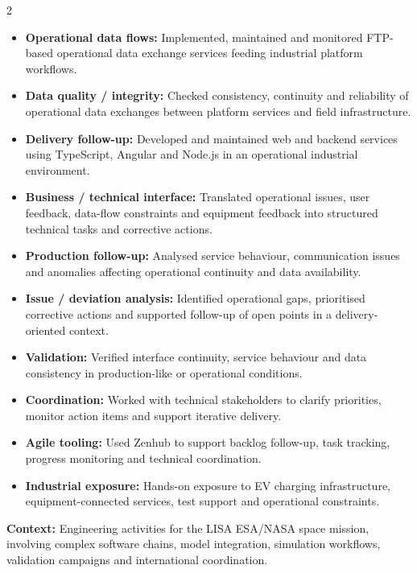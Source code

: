 \documentclass[8pt,a4paper,ragged2e,withhyper]{altacv}
\begin{document}
\begin{paracol}{2}
\begin{itemize}
  \item \textbf{Operational data flows:} Implemented, maintained and monitored FTP-based operational data exchange services feeding industrial platform workflows.
  \item \textbf{Data quality / integrity:} Checked consistency, continuity and reliability of operational data exchanges between platform services and field infrastructure.
  \item \textbf{Delivery follow-up:} Developed and maintained web and backend services using TypeScript, Angular and Node.js in an operational industrial environment.
  \item \textbf{Business / technical interface:} Translated operational issues, user feedback, data-flow constraints and equipment feedback into structured technical tasks and corrective actions.
  \item \textbf{Production follow-up:} Analysed service behaviour, communication issues and anomalies affecting operational continuity and data availability.
  \item \textbf{Issue / deviation analysis:} Identified operational gaps, prioritised corrective actions and supported follow-up of open points in a delivery-oriented context.
  \item \textbf{Validation:} Verified interface continuity, service behaviour and data consistency in production-like or operational conditions.
  \item \textbf{Coordination:} Worked with technical stakeholders to clarify priorities, monitor action items and support iterative delivery.
  \item \textbf{Agile tooling:} Used Zenhub to support backlog follow-up, task tracking, progress monitoring and technical coordination.
  \item \textbf{Industrial exposure:} Hands-on exposure to EV charging infrastructure, equipment-connected services, test support and operational constraints.
\end{itemize}

\divider


\textbf{Context:} Engineering activities for the LISA ESA/NASA space mission, involving complex software chains, model integration, simulation workflows, validation campaigns and international coordination.


\end{paracol}
\end{document}
